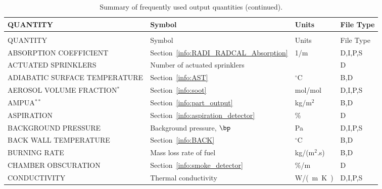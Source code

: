 \documentclass[11pt]{book}
\begin{document}
\begin{longtable}{@{\extracolsep{\fill}}|l|l|l|l|}
\caption[Frequently used output quantities]{Summary of frequently used output quantities.}
\label{tab:output} \\
\hline
{\ct QUANTITY}                           & Symbol                                        & Units          & File Type    \\
\hline \hline
\endfirsthead
\caption[]{Summary of frequently used output quantities (continued).} \\
\hline
{\ct QUANTITY}                           & Symbol                                        & Units          & File Type    \\
\hline \hline
\endhead
{\ct ABSORPTION COEFFICIENT}                    & Section~\ref{info:RADI_RADCAL_Absorption}     & 1/m            & D,I,P,S      \\ \hline
{\ct ACTUATED SPRINKLERS}                       & Number of actuated sprinklers                 &                & D            \\ \hline
{\ct ADIABATIC SURFACE TEMPERATURE}             & Section~\ref{info:AST}                        & $^\circ$C      & B,D          \\ \hline
{\ct AEROSOL VOLUME FRACTION}$^*$               & Section~\ref{info:soot}                       & mol/mol        & D,I,P,S      \\ \hline
{\ct AMPUA}$^{**}$                              & Section~\ref{info:part_output}                & kg/m$^2$       & B,D          \\ \hline
{\ct ASPIRATION}                                & Section~\ref{info:aspiration_detector}        & \%             & D            \\ \hline
{\ct BACKGROUND PRESSURE}                       & Background pressure, $\bp$                    & Pa             & D,I,P,S      \\ \hline
{\ct BACK WALL TEMPERATURE}                     & Section~\ref{info:BACK}                       & $^\circ$C      & B,D          \\ \hline
{\ct BURNING RATE}                              & Mass loss rate of fuel                        & \si{kg/(m$^2$.s)} & B,D          \\ \hline
{\ct CHAMBER OBSCURATION}                       & Section~\ref{info:smoke_detector}             & \%/m           & D            \\ \hline
{\ct CONDUCTIVITY}                              & Thermal conductivity                          & \si{W/(m.K)}   & D,I,P,S      \\ \hline

\end{longtable}
\end{document}

